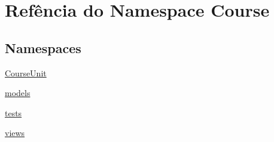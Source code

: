 \hypertarget{namespaceCourse}{\section{Refência do Namespace Course}
\label{namespaceCourse}
}
\subsection*{Namespaces}
\begin{DoxyCompactItemize}
\item 
\hyperlink{namespaceCourse_1_1CourseUnit}{Course\-Unit}
\item 
\hyperlink{namespaceCourse_1_1models}{models}
\item 
\hyperlink{namespaceCourse_1_1tests}{tests}
\item 
\hyperlink{namespaceCourse_1_1views}{views}
\end{DoxyCompactItemize}
